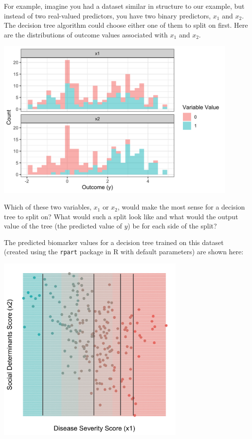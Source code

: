 For example, imagine you had a dataset similar in structure to our example, but instead of two real-valued predictors, you have two binary predictors, $x_1$ and $x_2$. The decision tree algorithm could choose either one of them to split on first. Here are the distributions of outcome values associated with $x_1$ and $x_2$. 

\begin{center}
\includegraphics[width=0.9\textwidth]{img/esl-reg-decision-tree-varsplit.png}
\end{center}

\begin{question}{}
Which of these two variables, $x_1$ or $x_2$, would make the most sense for a decision tree to split on? What would such a split look like and what would the output value of the tree (the predicted value of $y$) be for each side of the split?
\end{question}

The predicted biomarker values for a decision tree trained on this dataset (created using the \texttt{rpart} package in R with default parameters) are shown here:

\begin{center}
\includegraphics[width=0.7\textwidth]{img/esl-reg-decision-tree.png}
\end{center}

